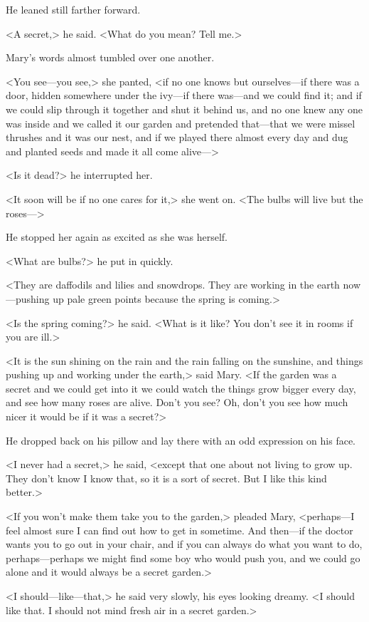 He leaned still farther forward.

<A secret,> he said. <What do you mean? Tell me.>

Mary's words almost tumbled over one another.

<You see—you see,> she panted, <if no one knows but ourselves—if there was a door, hidden somewhere under the ivy—if there was—and we could find it; and if we could slip through it together and shut it behind us, and no one knew any one was inside and we called it our garden and pretended that—that we were missel thrushes and it was our nest, and if we played there almost every day and dug and planted seeds and made it all come alive—>

<Is it dead?> he interrupted her.

<It soon will be if no one cares for it,> she went on. <The bulbs will live but the roses—>

He stopped her again as excited as she was herself.

<What are bulbs?> he put in quickly.

<They are daffodils and lilies and snowdrops. They are working in the earth now—pushing up pale green points because the spring is coming.>

<Is the spring coming?> he said. <What is it like? You don't see it in rooms if you are ill.>

<It is the sun shining on the rain and the rain falling on the sunshine, and things pushing up and working under the earth,> said Mary. <If the garden was a secret and we could get into it we could watch the things grow bigger every day, and see how many roses are alive. Don't you see? Oh, don't you see how much nicer it would be if it was a secret?>

He dropped back on his pillow and lay there with an odd expression on his face.

<I never had a secret,> he said, <except that one about not living to grow up. They don't know I know that, so it is a sort of secret. But I like this kind better.>

<If you won't make them take you to the garden,> pleaded Mary, <perhaps—I feel almost sure I can find out how to get in sometime. And then—if the doctor wants you to go out in your chair, and if you can always do what you want to do, perhaps—perhaps we might find some boy who would push you, and we could go alone and it would always be a secret garden.>

<I should—like—that,> he said very slowly, his eyes looking dreamy. <I should like that. I should not mind fresh air in a secret garden.>

